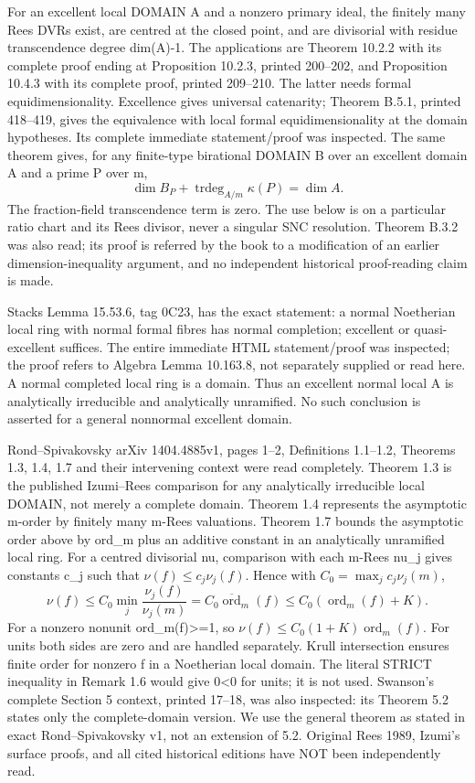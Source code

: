 \documentclass[11pt]{article}
\begin{document}
For an excellent local DOMAIN A and a nonzero primary ideal, the finitely many Rees DVRs exist, are centred at the closed point, and are divisorial with residue transcendence degree dim(A)-1. The applications are Theorem 10.2.2 with its complete proof ending at Proposition 10.2.3, printed 200--202, and Proposition 10.4.3 with its complete proof, printed 209--210. The latter needs formal equidimensionality. Excellence gives universal catenarity; Theorem B.5.1, printed 418--419, gives the equivalence with local formal equidimensionality at the domain hypotheses. Its complete immediate statement/proof was inspected. The same theorem gives, for any finite-type birational DOMAIN B over an excellent domain A and a prime P over m,
\[
 \dim B_P+\operatorname{trdeg}_{A/m}\kappa(P)=\dim A.
\]
The fraction-field transcendence term is zero. The use below is on a particular ratio chart and its Rees divisor, never a singular SNC resolution. Theorem B.3.2 was also read; its proof is referred by the book to a modification of an earlier dimension-inequality argument, and no independent historical proof-reading claim is made.

Stacks Lemma 15.53.6, tag 0C23, has the exact statement: a normal Noetherian local ring with normal formal fibres has normal completion; excellent or quasi-excellent suffices. The entire immediate HTML statement/proof was inspected; the proof refers to Algebra Lemma 10.163.8, not separately supplied or read here. A normal completed local ring is a domain. Thus an excellent normal local A is analytically irreducible and analytically unramified. No such conclusion is asserted for a general nonnormal excellent domain.

Rond--Spivakovsky arXiv 1404.4885v1, pages 1--2, Definitions 1.1--1.2, Theorems 1.3, 1.4, 1.7 and their intervening context were read completely. Theorem 1.3 is the published Izumi--Rees comparison for any analytically irreducible local DOMAIN, not merely a complete domain. Theorem 1.4 represents the asymptotic m-order by finitely many m-Rees valuations. Theorem 1.7 bounds the asymptotic order above by ord\_m plus an additive constant in an analytically unramified local ring. For a centred divisorial nu, comparison with each m-Rees nu\_j gives constants c\_j such that \(\nu(f)\le c_j\nu_j(f)\). Hence with \(C_0=\max_j c_j\nu_j(m)\),
\[
 \nu(f)\le C_0\min_j\frac{\nu_j(f)}{\nu_j(m)}
       =C_0\overline{\operatorname{ord}}_m(f)
       \le C_0(\operatorname{ord}_m(f)+K).
\]
For a nonzero nonunit ord\_m(f)>=1, so \(\nu(f)\le C_0(1+K)\operatorname{ord}_m(f)\). For units both sides are zero and are handled separately. Krull intersection ensures finite order for nonzero f in a Noetherian local domain. The literal STRICT inequality in Remark 1.6 would give 0<0 for units; it is not used. Swanson's complete Section 5 context, printed 17--18, was also inspected: its Theorem 5.2 states only the complete-domain version. We use the general theorem as stated in exact Rond--Spivakovsky v1, not an extension of 5.2. Original Rees 1989, Izumi's surface proofs, and all cited historical editions have NOT been independently read.
\end{document}
